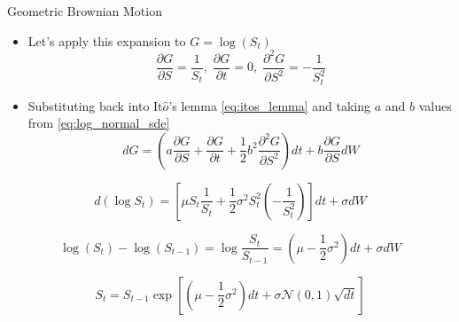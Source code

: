 \documentclass{beamer}
\begin{document}
\begin{frame}{Geometric Brownian Motion}
	\begin{itemize}
		\item Let's apply this expansion to $G=\log(S_t)$ 
		\begin{equation*}
			\frac{\partial G}{\partial S}=\frac{1}{S_t},\;\frac{\partial G}{\partial t}=0,\;\frac{\partial^2 G}{\partial S^2}=-\frac{1}{S_t^2}
		\end{equation*}
		\item Substituting back into It$\hat{o}$'s lemma \cref{eq:itos_lemma} and taking $a$ and $b$ values from \cref{eq:log_normal_sde}
		\begin{equation*}
			dG = \left(a\frac{\partial G}{\partial S} + \frac{\partial G}{\partial t} + \frac{1}{2}b^2\frac{\partial^2 G}{\partial S^2}\right)dt + b\frac{\partial G}{\partial S} dW
		\end{equation*}
	\end{itemize}
    
	\begin{equation*}
	d(\log S_t) = \left[\mu S_t\frac{1}{S_t} + \frac{1}{2}\sigma^2S_t^2\left(-\frac{1}{S_t^2}\right)\right]dt + \sigma dW
	\end{equation*}
	
	\begin{equation*}
	\log(S_t) - \log(S_{t-1}) = \log\frac{S_t}{S_{t-1}}=\left(\mu - \frac{1}{2}\sigma^2\right)dt + \sigma dW 
	\end{equation*}	
	
	\begin{equation}
	S_t = S_{t-1}\exp\left[\left(\mu-\frac{1}{2}\sigma^2\right)dt + \sigma\mathcal{N}(0,1)\sqrt{dt}\right] 
	\label{eq:lognormal_solution}
	\end{equation}
\end{frame}
\end{document}
